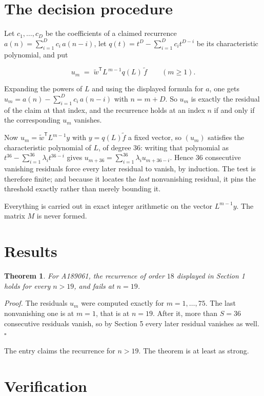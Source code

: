 \documentclass[11pt]{article}
\newtheorem{theorem}{Theorem}
\theoremstyle{definition}
\begin{document}
\section{The decision procedure}

Let $c_1,\dots,c_D$ be the coefficients of a claimed recurrence $a(n) = \sum_{i=1}^{D} c_i\,a(n-i)$, let $q(t) = t^{D} - \sum_{i=1}^{D} c_i t^{D-i}$ be its characteristic polynomial, and put

\[u_m \;=\; \tilde w^{\mathsf T} L^{\,m-1} q(L)\,\tilde f \qquad (m \ge 1).\]

Expanding the powers of $L$ and using the displayed formula for $a$, one gets $u_m = a(n) - \sum_{i=1}^{D} c_i\,a(n-i)$ with $n = m + D$. So $u_m$ is exactly the residual of the claim at that index, and the recurrence holds at an index $n$ if and only if the corresponding $u_m$ vanishes.

Now $u_m = \tilde w^{\mathsf T} L^{m-1} y$ with $y = q(L)\tilde f$ a fixed vector, so $(u_m)$ satisfies the characteristic polynomial of $L$, of degree $36$: writing that polynomial as $t^{36} - \sum_{i=1}^{36} \lambda_i t^{36-i}$ gives $u_{m+36} = \sum_{i=1}^{36} \lambda_i u_{m+36-i}$. Hence $36$ consecutive vanishing residuals force every later residual to vanish, by induction. The test is therefore finite; and because it locates the {\itshape last} nonvanishing residual, it pins the threshold exactly rather than merely bounding it.

Everything is carried out in exact integer arithmetic on the vector $L^{m-1}y$. The matrix $M$ is never formed.

\section{Results}

\begin{theorem} For A189061, the recurrence of order $18$ displayed in Section 1 holds for every $n > 19$, and fails at $n = 19$.\end{theorem}

{\itshape Proof.} The residuals $u_m$ were computed exactly for $m = 1,\dots,75$. The last nonvanishing one is at $m = 1$, that is at $n = 19$. After it, more than $S = 36$ consecutive residuals vanish, so by Section 5 every later residual vanishes as well. $\square$

The entry claims the recurrence for $n > 19$. The theorem is at least as strong.

\section{Verification}
\end{document}
